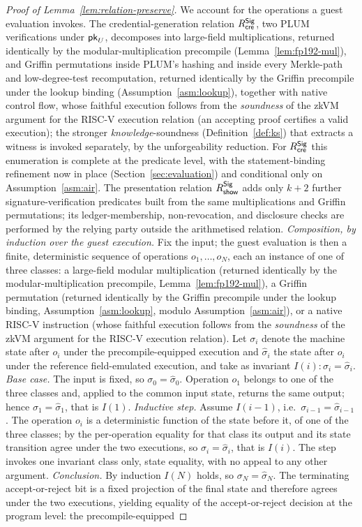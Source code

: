 \begin{proof}[Proof of Lemma~\ref{lem:relation-preserve}]
We account for the operations a guest evaluation invokes. The credential-generation relation $R^{\mathsf{Sig}}_{\mathsf{cre}}$, two PLUM verifications under $\mathsf{pk}_U$, decomposes into large-field multiplications, returned identically by the modular-multiplication precompile (Lemma~\ref{lem:fp192-mul}), and Griffin permutations inside PLUM's hashing and inside every Merkle-path and low-degree-test recomputation, returned identically by the Griffin precompile under the lookup binding (Assumption~\ref{asm:lookup}), together with native control flow, whose faithful execution follows from the \emph{soundness} of the zkVM argument for the RISC-V execution relation (an accepting proof certifies a valid execution); the stronger \emph{knowledge}-soundness (Definition~\ref{def:ks}) that extracts a witness is invoked separately, by the unforgeability reduction. For $R^{\mathsf{Sig}}_{\mathsf{cre}}$ this enumeration is complete at the predicate level, with the statement-binding refinement now in place (Section~\ref{sec:evaluation}) and conditional only on Assumption~\ref{asm:air}. The presentation relation $R^{\mathsf{Sig}}_{\mathsf{show}}$ adds only $k+2$ further signature-verification predicates built from the same multiplications and Griffin permutations; its ledger-membership, non-revocation, and disclosure checks are performed by the relying party outside the arithmetised relation. \emph{Composition, by induction over the guest execution.} Fix the input; the guest evaluation is then a finite, deterministic sequence of operations $o_1,\dots,o_N$, each an instance of one of three classes: a large-field modular multiplication (returned identically by the modular-multiplication precompile, Lemma~\ref{lem:fp192-mul}), a Griffin permutation (returned identically by the Griffin precompile under the lookup binding, Assumption~\ref{asm:lookup}, modulo Assumption~\ref{asm:air}), or a native RISC-V instruction (whose faithful execution follows from the \emph{soundness} of the zkVM argument for the RISC-V execution relation). Let $\sigma_i$ denote the machine state after $o_i$ under the precompile-equipped execution and $\hat\sigma_i$ the state after $o_i$ under the reference field-emulated execution, and take as invariant $I(i): \sigma_i=\hat\sigma_i$. \emph{Base case.} The input is fixed, so $\sigma_0=\hat\sigma_0$. Operation $o_1$ belongs to one of the three classes and, applied to the common input state, returns the same output; hence $\sigma_1=\hat\sigma_1$, that is $I(1)$. \emph{Inductive step.} Assume $I(i-1)$, i.e.\ $\sigma_{i-1}=\hat\sigma_{i-1}$. The operation $o_i$ is a deterministic function of the state before it, of one of the three classes; by the per-operation equality for that class its output and its state transition agree under the two executions, so $\sigma_i=\hat\sigma_i$, that is $I(i)$. The step invokes one invariant class only, state equality, with no appeal to any other argument. \emph{Conclusion.} By induction $I(N)$ holds, so $\sigma_N=\hat\sigma_N$. The terminating accept-or-reject bit is a fixed projection of the final state and therefore agrees under the two executions, yielding equality of the accept-or-reject decision at the program level: the precompile-equipped 
\end{proof}
